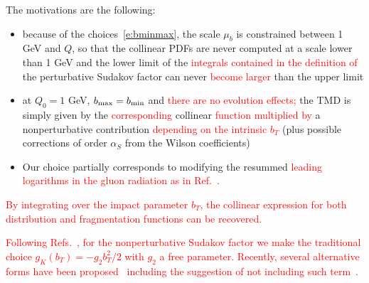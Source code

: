 \documentclass[aps,preprintnumbers,showpacs,nofootinbib,superscriptaddress,floatfix]{revtex4}
\begin{document}
The motivations are the following: 
\begin{itemize}
\item{} because of the choices~\eqref{e:bminmax}, the scale $\mu_b$ is constrained between 1 GeV and $Q$, so that the collinear PDFs are never computed at a scale lower than 1 GeV and the lower limit of the \textcolor{red}{integrals contained in the definition of} the perturbative Sudakov factor can never \textcolor{red}{become larger} than the upper limit

\item{} at $Q_0 = 1$ GeV, $b_{\rm max} = b_{\rm min}$ and \textcolor{red}{there are no evolution effects;} the TMD is
simply given by the \textcolor{red}{corresponding} collinear \textcolor{red}{function multiplied by} a nonperturbative contribution \textcolor{red}{depending on the intrinsic $b_T$} (plus possible corrections of order $\alpha_S$ from the Wilson coefficients)
 
\item{} Our choice partially corresponds to modifying the resummed \textcolor{red}{leading logarithms in the gluon radiation as in Ref.~\cite{Bozzi:2010xn}.} 
\end{itemize}
\textcolor{red}{By integrating over the impact parameter $b_T$, the collinear expression for both distribution and fragmentation functions can be recovered. }

\textcolor{red}{Following Refs.~\cite{Nadolsky:1999kb,Landry:2002ix,Konychev:2005iy}, for the nonperturbative Sudakov factor we make the traditional choice $g_K (b_T) = - g_2 b_T^2 / 2$ with $g_2$ a free parameter. Recently, several alternative forms have been proposed~\cite{Aidala:2014hva,Collins:2014jpa} including the suggestion of not including such term~\cite{D'Alesio:2014vja}.}
\end{document}
